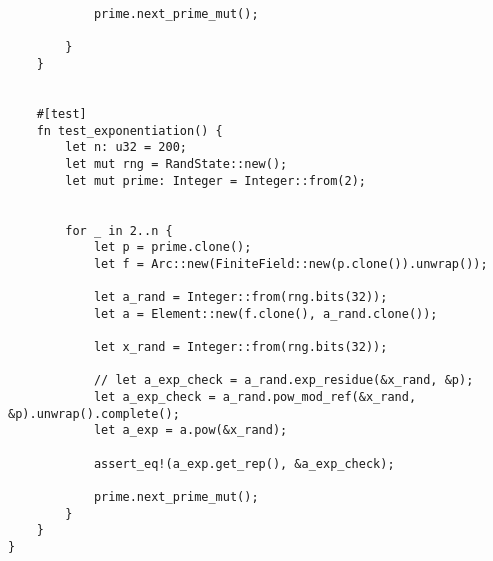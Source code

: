 \begin{verbatim}
            prime.next_prime_mut();

        }
    }


    #[test]
    fn test_exponentiation() {
        let n: u32 = 200;
        let mut rng = RandState::new();
        let mut prime: Integer = Integer::from(2);


        for _ in 2..n {
            let p = prime.clone();
            let f = Arc::new(FiniteField::new(p.clone()).unwrap());

            let a_rand = Integer::from(rng.bits(32));
            let a = Element::new(f.clone(), a_rand.clone());

            let x_rand = Integer::from(rng.bits(32));

            // let a_exp_check = a_rand.exp_residue(&x_rand, &p);
            let a_exp_check = a_rand.pow_mod_ref(&x_rand, &p).unwrap().complete();
            let a_exp = a.pow(&x_rand);

            assert_eq!(a_exp.get_rep(), &a_exp_check);

            prime.next_prime_mut();
        }
    }
}
\end{verbatim}


